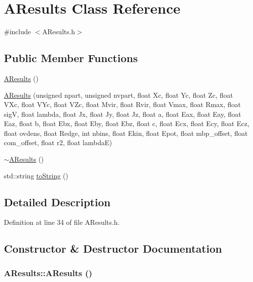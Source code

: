 \section{AResults Class Reference}
\label{classAResults}


{\ttfamily \#include $<$AResults.h$>$}

\subsection*{Public Member Functions}
\begin{DoxyCompactItemize}
\item 
\hyperlink{classAResults_aa853e8913a717bc97e392290c60640bb}{AResults} ()
\item 
\hyperlink{classAResults_acd4e9125d1faa207580f1f926235a0f8}{AResults} (unsigned npart, unsigned nvpart, float Xc, float Yc, float Zc, float VXc, float VYc, float VZc, float Mvir, float Rvir, float Vmax, float Rmax, float sigV, float lambda, float Jx, float Jy, float Jz, float a, float Eax, float Eay, float Eaz, float b, float Ebx, float Eby, float Ebz, float c, float Ecx, float Ecy, float Ecz, float ovdens, float Redge, int nbins, float Ekin, float Epot, float mbp\_\-offset, float com\_\-offset, float r2, float lambdaE)
\item 
\hyperlink{classAResults_aee48c3e18ec0c623fc67e145eb686969}{$\sim$AResults} ()
\item 
std::string \hyperlink{classAResults_a5cbf739d3059e7a97d223c8e0826b092}{toString} ()
\end{DoxyCompactItemize}


\subsection{Detailed Description}


Definition at line 34 of file AResults.h.



\subsection{Constructor \& Destructor Documentation}
\subsubsection[{AResults}]{\setlength{\rightskip}{0pt plus 5cm}AResults::AResults ()}\label{classAResults_aa853e8913a717bc97e392290c60640bb}



